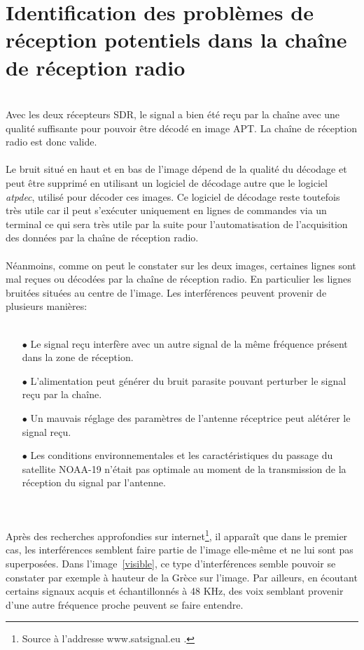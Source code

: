 \documentclass[12pt,fleqn]{book} %
\begin{document}
\section{Identification des problèmes de réception potentiels dans la chaîne de réception radio}
~\\\indent Avec les deux récepteurs SDR, le signal a bien été reçu par la chaîne avec une qualité suffisante pour pouvoir être décodé en image APT. La chaîne de réception radio est donc valide.
~\\\\Le bruit situé en haut et en bas de l'image dépend de la qualité du décodage et peut être supprimé en utilisant un logiciel de décodage autre que le logiciel \emph{atpdec}, utilisé pour décoder ces images. Ce logiciel de décodage reste toutefois très utile car il peut s'exécuter uniquement en lignes de commandes via un terminal ce qui sera très utile par la suite pour l'automatisation de l'acquisition des données par la chaîne de réception radio.
~\\\\Néanmoins, comme on peut le constater sur les deux images, certaines lignes sont mal reçues ou décodées par la chaîne de réception radio. En particulier les lignes bruitées situées au centre de l'image. Les interférences peuvent provenir de plusieurs manières:
~\\\\
\begin{itemize}
 \item[$\bullet$] Le signal reçu interfère avec un autre signal de la même fréquence présent dans la zone de réception.
 \item[$\bullet$] L'alimentation peut générer du bruit parasite pouvant perturber le signal reçu par la chaîne.
 \item[$\bullet$] Un mauvais réglage des paramètres de l'antenne réceptrice peut alétérer le signal reçu.
 \item[$\bullet$] Les conditions environnementales et les caractéristiques du passage du satellite NOAA-19 n'était pas optimale au moment de la transmission de la réception du signal par l'antenne.
\end{itemize}
~\\\\
Après des recherches approfondies sur internet\footnote{Source à l'addresse www.satsignal.eu .}, il apparaît que dans le premier cas, les interférences semblent faire partie de l'image elle-même et ne lui sont pas superposées. Dans l'image~\ref{visible}, ce type d'interférences semble pouvoir se constater par exemple à hauteur de la Grèce sur l'image. Par ailleurs, en écoutant certains signaux acquis et échantillonnés à 48 KHz, des voix semblant provenir d'une autre fréquence proche peuvent se faire entendre.
\end{document}
